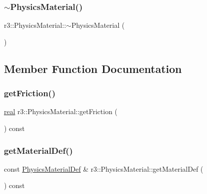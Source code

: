 \subsubsection{\texorpdfstring{$\sim$\+Physics\+Material()}{~PhysicsMaterial()}}
{\footnotesize\ttfamily r3\+::\+Physics\+Material\+::$\sim$\+Physics\+Material (\begin{DoxyParamCaption}{ }\end{DoxyParamCaption})\hspace{0.3cm}{\ttfamily [default]}}



\subsection{Member Function Documentation}
\mbox{\label{classr3_1_1_physics_material_ace861dc19a676ebdb19193076b24a458}} 
\subsubsection{\texorpdfstring{get\+Friction()}{getFriction()}}
{\footnotesize\ttfamily \mbox{\hyperlink{namespacer3_ab2016b3e3f743fb735afce242f0dc1eb}{real}} r3\+::\+Physics\+Material\+::get\+Friction (\begin{DoxyParamCaption}{ }\end{DoxyParamCaption}) const}

\mbox{\label{classr3_1_1_physics_material_a652318d9fa4f6db099dc58d6f6ae314a}} 
\subsubsection{\texorpdfstring{get\+Material\+Def()}{getMaterialDef()}}
{\footnotesize\ttfamily const \mbox{\hyperlink{structr3_1_1_physics_material_def}{Physics\+Material\+Def}} \& r3\+::\+Physics\+Material\+::get\+Material\+Def (\begin{DoxyParamCaption}{ }\end{DoxyParamCaption}) const}

